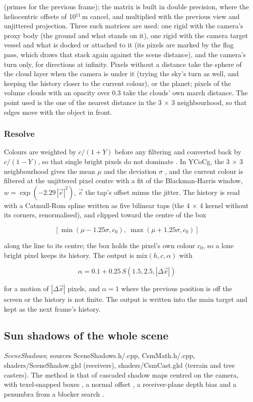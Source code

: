 \documentclass[Orbiter Technical Reference.tex]{subfiles}
\begin{document}
\begin{sloppypar}
\noindent
(primes for the previous frame); the matrix is built in double precision, where the heliocentric offsets of 10$^{11}$\,m cancel, and multiplied with the previous view and unjittered projection. Three such matrices are used: one rigid with the camera's proxy body (the ground and what stands on it), one rigid with the camera target vessel and what is docked or attached to it (its pixels are marked by the flag pass, which draws that stack again against the scene distance), and the camera's turn only, for directions at infinity. Pixels without a distance take the sphere of the cloud layer when the camera is under it (trying the sky's turn as well, and keeping the history closer to the current colour), or the planet; pixels of the volume clouds with an opacity over 0.3 take the clouds' own march distance. The point used is the one of the nearest distance in the 3 $\times$ 3 neighbourhood, so that edges move with the object in front.

\subsubsection{Resolve}
Colours are weighted by $c/(1+Y)$ before any filtering and converted back by $c/(1-Y)$, so that single bright pixels do not dominate \cite{karis2014taa}. In YCoCg, the 3 $\times$ 3 neighbourhood gives the mean $\mu$ and the deviation $\sigma$ \cite{salvi2016}, and the current colour is filtered at the unjittered pixel centre with a fit of the Blackman-Harris window, $w = \exp(-2.29\,|\vec{e}|^{2})$, $\vec{e}$ the tap's offset minus the jitter. The history is read with a Catmull-Rom spline \cite{catmull1974} written as five bilinear taps (the 4 $\times$ 4 kernel without its corners, renormalised), and clipped toward the centre of the box

\[ [\min(\mu - 1.25\sigma, c_{0}),\; \max(\mu + 1.25\sigma, c_{0})] \]

\noindent
along the line to its centre; the box holds the pixel's own colour $c_{0}$, so a lone bright pixel keeps its history. The output is $\mathrm{mix}(h, c, \alpha)$ with

\[ \alpha = 0.1 + 0.25\,S(1.5, 2.5, |\Delta\vec{x}|) \]

\noindent
for a motion of $|\Delta\vec{x}|$ pixels, and $\alpha = 1$ where the previous position is off the screen or the history is not finite. The output is written into the main target and kept as the next frame's history.



\subsection{Sun shadows of the whole scene}\label{sec:vk_csm}
\textit{SceneShadows}; sources SceneShadows.h/.cpp, CsmMath.h/.cpp, shaders/SceneShadow.glsl (receivers), shaders/CsmCast.glsl (terrain and tree casters). The method is that of cascaded shadow maps \cite{engel2006} centred on the camera, with texel-snapped boxes \cite{valient2008}, a normal offset \cite{holbert2011}, a receiver-plane depth bias \cite{isidoro2006} and a penumbra from a blocker search \cite{fernando2005}.


\end{sloppypar}
\end{document}
